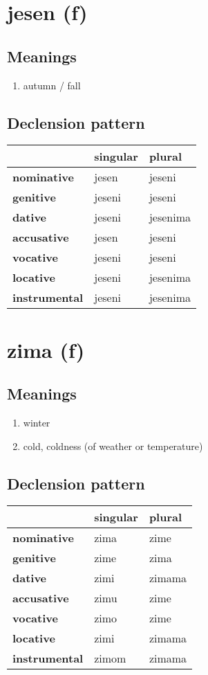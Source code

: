 \filbreak
\section{jesen (f)}
\subsection*{Meanings}
\begin{enumerate}
\item autumn / fall
\end{enumerate}
\subsection*{Declension pattern}
\begin{tabularx}{\linewidth}{Xll}
\toprule
{} & singular &    plural \\
\midrule
\textbf{nominative  } &    jesen &    jeseni \\
\textbf{genitive    } &   jeseni &    jeseni \\
\textbf{dative      } &   jeseni &  jesenima \\
\textbf{accusative  } &    jesen &    jeseni \\
\textbf{vocative    } &   jeseni &    jeseni \\
\textbf{locative    } &   jeseni &  jesenima \\
\textbf{instrumental} &   jeseni &  jesenima \\
\bottomrule
\end{tabularx}

\filbreak
\section{zima (f)}
\subsection*{Meanings}
\begin{enumerate}
\item winter
\item cold, coldness (of weather or temperature)
\end{enumerate}
\subsection*{Declension pattern}
\begin{tabularx}{\linewidth}{Xll}
\toprule
{} & singular &  plural \\
\midrule
\textbf{nominative  } &     zima &    zime \\
\textbf{genitive    } &     zime &    zima \\
\textbf{dative      } &     zimi &  zimama \\
\textbf{accusative  } &     zimu &    zime \\
\textbf{vocative    } &     zimo &    zime \\
\textbf{locative    } &     zimi &  zimama \\
\textbf{instrumental} &    zimom &  zimama \\
\bottomrule
\end{tabularx}

